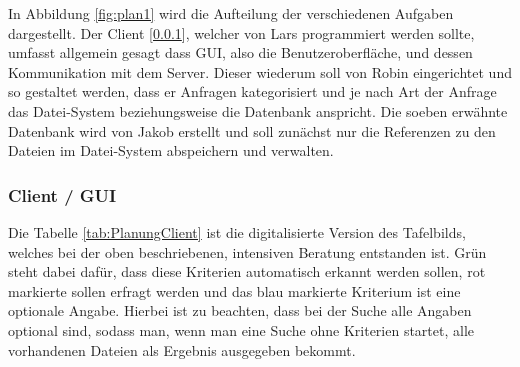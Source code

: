 \documentclass[12pt,a4paper,bibliography=totocnumbered,listof=totocnumbered]{scrartcl}
\begin{document}
In Abbildung \ref{fig:plan1} wird die Aufteilung der verschiedenen Aufgaben dargestellt. Der Client [\ref{sec:Client / GUI}], welcher von Lars programmiert werden sollte, umfasst allgemein gesagt dass GUI, also die Benutzeroberfläche, und dessen Kommunikation mit dem Server. Dieser wiederum soll von Robin eingerichtet und so gestaltet werden, dass er Anfragen kategorisiert und je nach Art der Anfrage das Datei-System beziehungsweise die Datenbank anspricht. Die soeben erwähnte Datenbank wird von Jakob erstellt und soll zunächst nur die Referenzen zu den Dateien im Datei-System abspeichern und verwalten.\\

\subsubsection{Client / GUI}
\label{sec:Client / GUI}

Die Tabelle \ref{tab:PlanungClient} ist die digitalisierte Version des Tafelbilds, welches bei der oben beschriebenen, intensiven Beratung entstanden ist. Grün steht dabei dafür, dass diese Kriterien automatisch erkannt werden sollen, rot markierte sollen erfragt werden und das blau markierte Kriterium ist eine optionale Angabe. Hierbei ist zu beachten, dass bei der Suche alle Angaben optional sind, sodass man, wenn man eine Suche ohne Kriterien startet, alle vorhandenen Dateien als Ergebnis ausgegeben bekommt.
\end{document}
